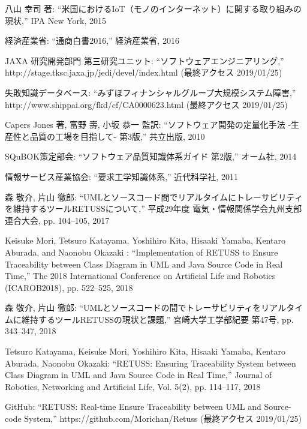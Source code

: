 \documentclass[uplatex, report, a4j, 10pt]{jsbook}
\begin{document}
%
\begin{thebibliography}{99}
   八山 幸司 著: ``米国におけるIoT（モノのインターネット）に関する取り組みの現状,'' IPA New York, 2015
  
   経済産業省: ``通商白書2016,'' 経済産業省, 2016
  
   JAXA 研究開発部門 第三研究ユニット: ``ソフトウェアエンジニアリング,'' http://stage.tksc.jaxa.jp/jedi/devel/index.html (最終アクセス 2019/01/25)
  
   失敗知識データベース: ``みずほフィナンシャルグループ大規模システム障害,'' http://www.shippai.org/fkd/cf/CA0000623.html (最終アクセス 2019/01/25)
  
   Capers Jones 著, 富野 壽, 小坂 恭一 監訳: ``ソフトウェア開発の定量化手法 -生産性と品質の工場を目指して- 第3版,'' 共立出版, 2010
  
   SQuBOK策定部会: ``ソフトウェア品質知識体系ガイド 第2版,'' オーム社, 2014
  
   情報サービス産業協会: ``要求工学知識体系,'' 近代科学社, 2011
  
  
   森 敬介, 片山 徹郎: ``UMLとソースコード間でリアルタイムにトレーサビリティを維持するツールRETUSSについて,'' 平成29年度 電気・情報関係学会九州支部連合大会, pp. 104--105, 2017
  
   Keisuke Mori, Tetsuro Katayama, Yoshihiro Kita, Hisaaki Yamaba, Kentaro Aburada, and Naonobu Okazaki : ``Implementation of RETUSS to Ensure Traceability between Class Diagram in UML and Java Source Code in Real Time,'' The 2018 International Conference on Artificial Life and Robotics (ICAROB2018), pp. 522--525, 2018
  
   森 敬介, 片山 徹郎: ``UMLとソースコードの間でトレーサビリティをリアルタイムに維持するツールRETUSSの現状と課題,'' 宮崎大学工学部紀要 第47号, pp. 343--347, 2018
  
   Tetsuro Katayama, Keisuke Mori, Yoshihiro Kita, Hisaaki Yamaba, Kentaro Aburada, Naonobu Okazaki: ``RETUSS: Ensuring Traceability System between Class Diagram in UML and Java Source Code in Real Time,'' Journal of Robotics, Networking and Artificial Life, Vol. 5(2), pp. 114--117, 2018
  
   GitHub: ``RETUSS: Real-time Ensure Traceability between UML and Source-code System,'' https://github.com/Morichan/Retuss (最終アクセス 2019/01/25)
  

\end{thebibliography}
\end{document}
